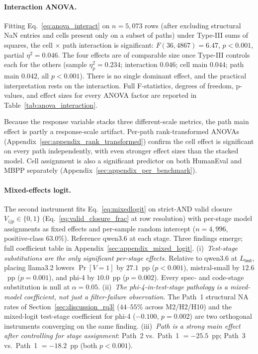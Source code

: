 \paragraph{Interaction ANOVA.} Fitting Eq.~\ref{eq:anova_interact} on $n = 5{,}073$ rows (after excluding structural NaN entries and cells present only on a subset of paths) under Type-III sums of squares, the cell $\times$ path interaction is significant: $F(36, 4867) = 6.47$, $p < 0.001$, partial $\eta^2 = 0.046$. The four effects are of comparable size once Type-III controls each for the others (sample $\eta^2_p = 0.234$; interaction $0.046$; cell main $0.044$; path main $0.042$, all $p < 0.001$). There is no single dominant effect, and the practical interpretation rests on the interaction. Full F-statistics, degrees of freedom, p-values, and effect sizes for every ANOVA factor are reported in Table~\ref{tab:anova_interaction}.



Because the response variable stacks three different-scale metrics, the path main effect is partly a response-scale artifact. Per-path rank-transformed ANOVAs (Appendix~\ref{sec:appendix_rank_transformed}) confirm the cell effect is significant on every path independently, with even stronger effect sizes than the stacked model. Cell assignment is also a significant predictor on both HumanEval and MBPP separately (Appendix~\ref{sec:appendix_per_benchmark}).

\paragraph{Mixed-effects logit.} The second instrument fits Eq.~\ref{eq:mixedlogit} on strict-AND valid closure $V_{ijp} \in \{0, 1\}$ (Eq.~\ref{eq:valid_closure_frac} at row resolution) with per-stage model assignments as fixed effects and per-sample random intercept ($n = 4{,}996$, positive-class $63.0\%$). Reference qwen3.6 at each stage. Three findings emerge; full coefficient table in Appendix~\ref{sec:appendix_mixed_logit}. (i)~\emph{Test-stage substitutions are the only significant per-stage effects.} Relative to qwen3.6 at $L_{\textsf{test}}$, placing llama3.2 lowers $\Pr[V = 1]$ by $27.1$~pp ($p < 0.001$), mistral-small by $12.6$~pp ($p = 0.001$), and phi-4 by $10.0$~pp ($p = 0.002$). Every spec- and code-stage substitution is null at $\alpha = 0.05$. (ii)~\emph{The phi-4-in-test-stage pathology is a mixed-model coefficient, not just a filter-failure observation.} The Path~1 structural NA rates of Section~\ref{sec:discussion_rq3} ($44$--$55\%$ across M2/H2/H10) and the mixed-logit test-stage coefficient for phi-4 ($-0.100$, $p = 0.002$) are two orthogonal instruments converging on the same finding. (iii)~\emph{Path is a strong main effect after controlling for stage assignment}: Path~2 vs.\ Path~1 $= -25.5$~pp; Path~3 vs.\ Path~1 $= -18.2$~pp (both $p < 0.001$).

